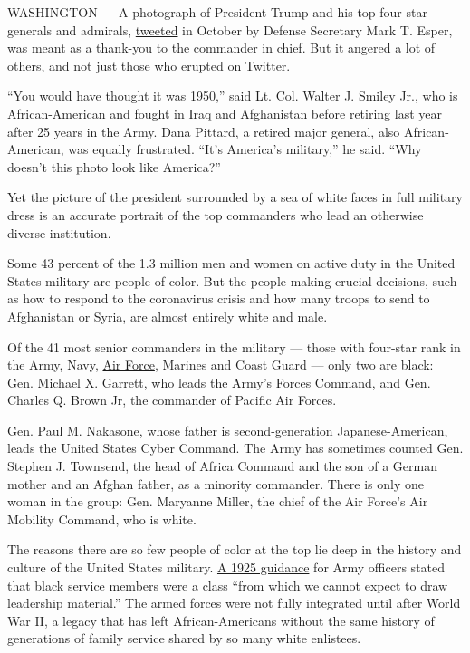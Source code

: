 WASHINGTON --- A photograph of President Trump and his top four-star
generals and admirals,
\href{https://twitter.com/EsperDoD/status/1181572097384095745}{tweeted}
in October by Defense Secretary Mark T. Esper, was meant as a thank-you
to the commander in chief. But it angered a lot of others, and not just
those who erupted on Twitter.

``You would have thought it was 1950,'' said Lt. Col. Walter J. Smiley
Jr., who is African-American and fought in Iraq and Afghanistan before
retiring last year after 25 years in the Army. Dana Pittard, a retired
major general, also African-American, was equally frustrated. ``It's
America's military,'' he said. ``Why doesn't this photo look like
America?''

Yet the picture of the president surrounded by a sea of white faces in
full military dress is an accurate portrait of the top commanders who
lead an otherwise diverse institution.

Some 43 percent of the 1.3 million men and women on active duty in the
United States military are people of color. But the people making
crucial decisions, such as how to respond to the coronavirus crisis and
how many troops to send to Afghanistan or Syria, are almost entirely
white and male.

Of the 41 most senior commanders in the military --- those with
four-star rank in the Army, Navy,
\href{https://www.nytimes3xbfgragh.onion/2020/06/09/us/politics/general-charles-brown-air-force.html}{Air
Force}, Marines and Coast Guard --- only two are black: Gen. Michael X.
Garrett, who leads the Army's Forces Command, and Gen. Charles Q. Brown
Jr, the commander of Pacific Air Forces.

Gen. Paul M. Nakasone, whose father is second-generation
Japanese-American, leads the United States Cyber Command. The Army has
sometimes counted Gen. Stephen J. Townsend, the head of Africa Command
and the son of a German mother and an Afghan father, as a minority
commander. There is only one woman in the group: Gen. Maryanne Miller,
the chief of the Air Force's Air Mobility Command, who is white.

The reasons there are so few people of color at the top lie deep in the
history and culture of the United States military.
\href{https://www.fdrlibrary.org/documents/356632/390886/tusk_doc_a.pdf/4693156a-8844-4361-ae17-03407e7a3dee}{A
1925 guidance} for Army officers stated that black service members were
a class ``from which we cannot expect to draw leadership material.'' The
armed forces were not fully integrated until after World War II, a
legacy that has left African-Americans without the same history of
generations of family service shared by so many white enlistees.

